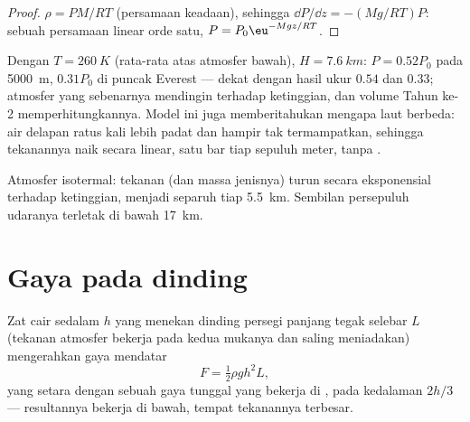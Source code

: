 \begin{proof}
$\rho = PM/RT$ (persamaan keadaan), sehingga $\dd P/\dd z = -(Mg/RT)P$: sebuah
persamaan linear orde satu, $P = P_0\eu^{-Mgz/RT}$.
\end{proof}

\begin{example}\label{ex:b1:fluid-statics:altitude}
Dengan $T = \qty{260}{K}$ (rata-rata atas atmosfer bawah), $H =
\qty{7.6}{km}$: $P = 0.52P_0$ pada \qty{5000}{m}, $0.31P_0$ di puncak
Everest --- dekat dengan hasil ukur $0.54$ dan $0.33$; atmosfer yang sebenarnya
mendingin terhadap ketinggian, dan volume Tahun ke-2 memperhitungkannya. Model
ini juga memberitahukan mengapa laut berbeda: air delapan ratus kali lebih
padat dan hampir tak termampatkan, sehingga tekanannya naik secara linear, satu bar
tiap sepuluh meter, tanpa .
\end{example}

\begin{omfigure}

{\small Atmosfer isotermal: tekanan (dan massa jenisnya) turun
secara eksponensial terhadap ketinggian, menjadi separuh tiap \qty{5.5}{km}. Sembilan persepuluh
udaranya terletak di bawah \qty{17}{km}.}
\end{omfigure}

\section{Gaya pada dinding}

\begin{proposition}\label{prop:b1:fluid-statics:wall}
Zat cair sedalam $h$ yang menekan dinding persegi panjang tegak selebar $L$
(tekanan atmosfer bekerja pada kedua mukanya dan saling meniadakan) mengerahkan
gaya mendatar
\[
F = \tfrac12\rho gh^2L ,
\]
yang setara dengan sebuah gaya tunggal yang bekerja di \emph{},
pada kedalaman $2h/3$ --- resultannya bekerja di bawah, tempat tekanannya
terbesar.
\end{proposition}

